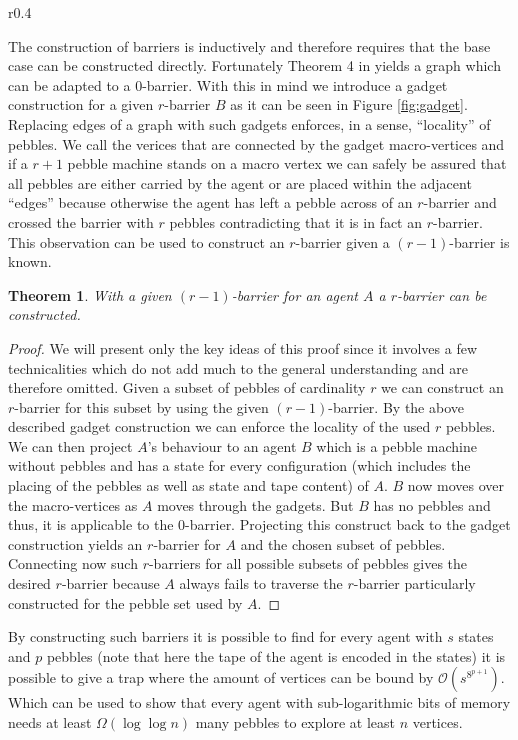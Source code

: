 \documentclass[draft,oneside]{scrartcl}
\newtheorem{thm}{Theorem}
\begin{document}
\begin{wrapfigure}{r}{0.4\textwidth}
  \caption{Gadget construction that ensures locality of pebbles.}
  \label{fig:gadget}
  \resizebox{0.4\textwidth}{!}{}
\end{wrapfigure}
The construction of barriers is inductively and therefore requires that the
base case can be constructed directly. Fortunately Theorem 4 in \cite{0barrier}
yields a graph which can be adapted to a 0-barrier. With this in mind we
introduce a gadget construction for a given $r$-barrier $B$ as it can be seen
in Figure \ref{fig:gadget}. Replacing edges of a graph with
such gadgets enforces, in a sense, \enquote{locality} of pebbles. We call
the verices that are connected by the gadget macro-vertices and if a $r+1$
pebble machine stands on a macro vertex we can safely be assured that all
pebbles are either carried by the agent or are placed within the adjacent
\enquote{edges} because otherwise the agent has left a pebble across of an
$r$-barrier and crossed the barrier with $r$ pebbles contradicting that it is
in fact an $r$-barrier. This observation can be used to construct an
$r$-barrier given a $(r-1)$-barrier is known.
\begin{thm}
  With a given $(r-1)$-barrier for an agent $A$ a $r$-barrier can be
  constructed.
\end{thm}
\begin{proof}
  We will present only the key ideas of this proof since it involves a
  few technicalities which do not add much to the general understanding
  and are therefore omitted. Given a subset of pebbles of cardinality $r$
  we can construct an $r$-barrier for this subset by using the given
  $(r-1)$-barrier. By the above described gadget construction we can enforce
  the locality of the used $r$ pebbles. We can then project
  $A$'s behaviour to an agent $B$ which is a pebble machine without pebbles
  and has a state for every configuration (which includes the placing of the
  pebbles as well as state and tape content) of $A$. $B$ now moves over the
  macro-vertices as $A$ moves through the gadgets. But $B$ has no pebbles and
  thus, it is applicable to the 0-barrier. Projecting this construct back to
  the gadget construction yields an $r$-barrier for $A$ and the chosen subset
  of pebbles. Connecting now such $r$-barriers for all possible subsets of
  pebbles gives the desired $r$-barrier because $A$ always fails to traverse
  the $r$-barrier particularly constructed for the pebble set used by $A$.
\end{proof}
By constructing such barriers it is possible to find for every agent
with $s$ states and $p$ pebbles (note that here the tape of the agent is
encoded in the states) it is possible to give a trap where the amount of
vertices can be bound by $\mathcal{O}(s^{8^{p+1}})$. Which can be used to
show that every agent with sub-logarithmic bits of memory needs at least
$\Omega(\log\log n)$ many pebbles to explore at least $n$ vertices.
\end{document}
